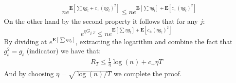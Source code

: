 \documentclass{article}
\newcommand{\expp}[1]{ \mathbf{E} \left[ {#1} \right]}
\begin{document}
\begin{multicols*}{2}
\begin{equation*}
\begin{split}
& n e^{\expp{ \sum {\eta g_{t} + c_{\pm}\left( \eta g_{t} \right)^{2} }}} \le n e^{\expp{ \sum {\eta g_{t}}} +\expp{{ c_{\pm}\left( \eta g_{t} \right)^{2} }}}
  \end{split}
\end{equation*}
On the other hand by the second property it follows that for any $j$: 
\begin{equation*}
  e^{\eta G_{j,T}} \le n e^{\expp{ \sum {\eta g_{t}}} +\expp{{ c_{\pm}\left( \eta g_{t} \right)^{2} }}}
\end{equation*} 
By dividing at $e^{\expp{ \sum {\eta g_{t}}}}$, extracting the logarithm and combine the fact that $g_{t}^2 = g_{t}$ (indicator) we have that: 
\begin{equation*}
  \begin{split}
    R_{T} \le \frac{1}{\eta}\log\left( n \right) + c_{+}\eta T
  \end{split}
\end{equation*}
And by choosing $\eta = \sqrt{\log\left( n \right)/T }$ we complete the proof. 

\end{multicols*}
\end{document}
